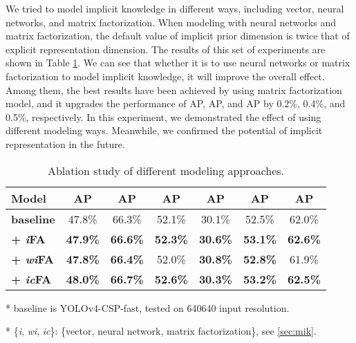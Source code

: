 \documentclass[10pt,twocolumn,letterpaper]{article}
\begin{document}
We tried to model implicit knowledge in different ways, including vector, neural networks, and matrix factorization. When modeling with neural networks and matrix factorization, the default value of implicit prior dimension is twice that of explicit representation dimension. The results of this set of experiments are shown in Table \ref{table:e6}. We can see that whether it is to use neural networks or matrix factorization to model implicit knowledge, it will improve the overall effect. Among them, the best results have been achieved by using matrix factorization model, and it upgrades the performance of AP, AP, and AP by 0.2\%, 0.4\%, and 0.5\%, respectively. In this experiment, we demonstrated the effect of using different modeling ways. Meanwhile, we confirmed the potential of implicit representation in the future.

\begin{table}[h]
	\centering
	\vspace{-2mm}
	\begin{threeparttable}[h]
		\footnotesize
		\caption{Ablation study of different modeling approaches.}
		\label{table:e6}
		\setlength\tabcolsep{4.5pt}
		\begin{tabular}{lcccccc}
			\toprule
			\textbf{Model} & \textbf{AP} & \textbf{AP} & \textbf{AP} & \textbf{AP} & \textbf{AP} & \textbf{AP} \\				
			\midrule
			\textbf{baseline} & 47.8\% & 66.3\% & 52.1\% & 30.1\% & 52.5\% & 62.0\% \\				
			\midrule
			\textbf{+ \textit{i}FA} & \textbf{47.9\%} & \textbf{66.6\%} & \textbf{52.3\%} & \textbf{30.6\%} & \textbf{53.1\%} & \textbf{62.6\%} \\
			\textbf{+ \textit{wi}FA} & \textbf{47.8\%} & \textbf{66.4\%} & 52.0\% & \textbf{30.8\%} & \textbf{52.8\%} & 61.9\% \\
			\textbf{+ \textit{ic}FA} & \textbf{48.0\%} & \textbf{66.7\%} & \textbf{52.6\%} & \textbf{30.3\%} & \textbf{53.2\%} & \textbf{62.5\%} \\
			\bottomrule
		\end{tabular}
		\begin{tablenotes}[flushleft]
			\footnotesize
			\item[*] baseline is YOLOv4-CSP-fast, tested on 640640 input resolution.
			\item[*] \{\textit{i}, \textit{wi}, \textit{ic}\}: \{vector, neural network, matrix factorization\}, see \ref{sec:mik}.
		\end{tablenotes}
	\end{threeparttable}
    \vspace{-4mm}
\end{table}
\end{document}
